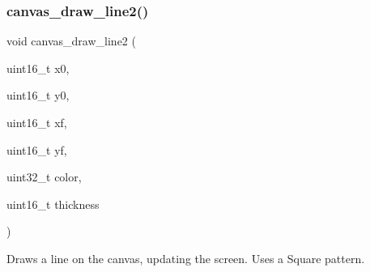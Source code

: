 \subsubsection{\texorpdfstring{canvas\+\_\+draw\+\_\+line2()}{canvas\_draw\_line2()}}
{\footnotesize\ttfamily void canvas\+\_\+draw\+\_\+line2 (\begin{DoxyParamCaption}\item[{uint16\+\_\+t}]{x0,  }\item[{uint16\+\_\+t}]{y0,  }\item[{uint16\+\_\+t}]{xf,  }\item[{uint16\+\_\+t}]{yf,  }\item[{uint32\+\_\+t}]{color,  }\item[{uint16\+\_\+t}]{thickness }\end{DoxyParamCaption})}



Draws a line on the canvas, updating the screen. Uses a Square pattern. 


